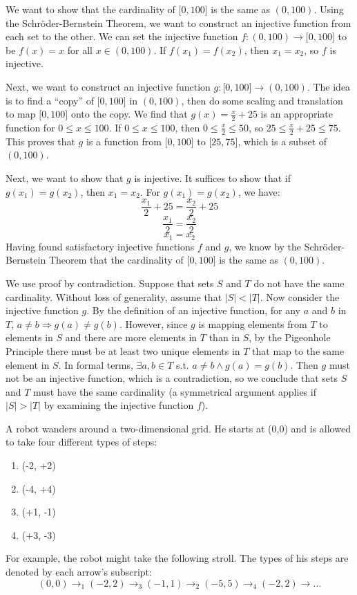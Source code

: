 \documentclass[solution, letterpaper]{cs20}
\begin{document}
\begin{solution}
\subsolution We want to show that the cardinality of $\big[0,100\big]$ is the same as $(0,100)$. Using the Schr\"{o}der-Bernstein Theorem, we want to construct an injective function from each set to the other. We can set the injective function $f : (0, 100) \rightarrow \big[0, 100\big]$ to be $f(x) = x$ for all $x \in (0, 100)$. If $f(x_1) = f(x_2)$, then $x_1 = x_2$, so $f$ is injective.

Next, we want to construct an injective function $g : \big[0, 100\big] \rightarrow (0, 100)$. The idea is to find a ``copy'' of $\big[0, 100\big]$ in $(0, 100)$, then do some scaling and translation to map $\big[0, 100\big]$ onto the copy. We find that $g(x) = \frac{x}{2} + 25$ is an appropriate function for $0 \leq x \leq 100$. If $0 \leq x \leq 100$, then $0 \leq \frac{x}{2} \leq 50$, so $25 \leq \frac{x}{2} + 25 \leq 75$. This proves that $g$ is a function from $\big[0, 100\big]$ to $\big[25, 75\big]$, which is a subset of $(0,100)$.

Next, we want to show that $g$ is injective. It suffices to show that if $g(x_1) = g(x_2)$, then $x_1 = x_2$. For $g(x_1) = g(x_2)$, we have: 
$$\frac{x_1}{2} + 25 = \frac{x_2}{2} + 25$$
$$\frac{x_1}{2} = \frac{x_2}{2}$$
$$x_1 = x_2$$
Having found satisfactory injective functions $f$ and $g$, we know by the Schr\"{o}der-Bernstein Theorem that the cardinality of $\big[0,100\big]$ is the same as $(0,100)$.

\subsolution We use proof by contradiction. Suppose that sets $S$ and $T$ do not have the same cardinality. Without loss of generality, assume that $|S| < |T|$. Now consider the injective function $g$. By the definition of an injective function, for any $a$ and $b$ in $T$, $a \neq b \Rightarrow g(a) \neq g(b)$. However, since $g$ is mapping elements from $T$ to elements in $S$ and there are more elements in $T$ than in $S$, by the Pigeonhole Principle there must be at least two unique elements in $T$ that map to the same element in $S$. In formal terms, $\exists a,b \in T $ s.t. $a \neq b \wedge g(a) = g(b)$. Then $g$ must not be an injective function, which is a contradiction, so we conclude that sets $S$ and $T$ must have the same cardinality (a symmetrical argument applies if $|S| > |T|$ by examining the injective function $f$).
\end{solution}

A robot wanders around a two-dimensional grid. He starts at (0,0) and is allowed to take four different types of steps:
\begin{enumerate}
\item (-2, +2)
\item (-4, +4)
\item (+1, -1)
\item (+3, -3)
\end{enumerate}
For example, the robot might take the following stroll. The types of his steps are denoted by each arrow's subscript:
$$(0,0) \to_1 (-2,2) \to_3 (-1,1) \to_2 (-5,5) \to_4 (-2,2) \to \ldots$$
\end{document}
